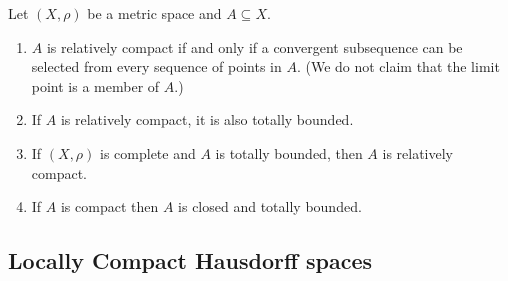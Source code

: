 \documentclass{article}
\theoremstyle{definition}
\numberwithin{equation}{section}
\begin{document}
	\begin{thm} \label{thm:compactness-properties} Let $(X,\rho)$ be a metric space and $A\subseteq X$.
		\begin{enumerate}
			\item $A$ is relatively compact if and only if a convergent subsequence can be selected from every sequence of points in $A$. (We do not claim that the limit point is a member of $A$.)
			\item If $A$ is relatively compact, it is also totally bounded.
			\item If $(X,\rho)$ is complete and $A$ is totally bounded, then $A$ is relatively compact.
			\item If $A$ is compact then $A$ is closed and totally bounded.
		\end{enumerate}
	\end{thm}
	
	\subsection{Locally Compact Hausdorff spaces}
	
\end{document}
